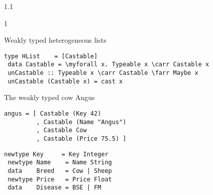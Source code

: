 \documentclass{slides}
\newenvironment{myslide}{\begin{slide}\color{Blue}\begin{boxedminipage}{1.1\hsize}\begin{boxedminipage}{1\hsize}\color{Black}
\vspace{-170\in}
}{%
\smallskip
\end{boxedminipage}
\end{boxedminipage}
\end{slide}}
\newenvironment{myslide}{\begin{slide}
}{%
\end{slide}}
\newenvironment{myslide}{\begin{slide}\color{White}\begin{boxedminipage}{1.1\hsize}\color{Black}
\vspace{-170\in}
}{%
\smallskip
\end{boxedminipage}
\end{slide}}
\newcommand{\header}[1]{{\large \color{Red} #1}}
\newcommand{\blau}[1]{{\vspace{-50\in}\normalsize \color{Blue} #1}}
\newcommand{\myforall}{\ensuremath{\forall}}
\newcommand{\farr}{\ensuremath{\to}}
\newcommand{\carr}{\ensuremath{\Rightarrow}}
\begin{document}



\begin{myslide}

\header{Weakly typed heterogeneous lists}

\bigskip

\begin{Verbatim}[fontfamily=courier,fontsize=\small,commandchars=\\\{\}]
 type HList    = [Castable]
 data Castable = \myforall x. Typeable x \carr Castable x 
 unCastable :: Typeable x \carr Castable \farr Maybe x
 unCastable (Castable x) = cast x
\end{Verbatim}

\vspace{-66\in}

\blau{The weakly typed cow Angus}

\medskip

\begin{Verbatim}[fontfamily=courier,fontsize=\small,commandchars=\\\{\}]
 angus = [ Castable (Key 42)
         , Castable (Name "Angus")
         , Castable Cow
         , Castable (Price 75.5) ] 
\end{Verbatim}

\bigskip

\begin{Verbatim}[fontfamily=courier,fontsize=\tiny,commandchars=\\\{\}]
 newtype Key     = Key Integer
 newtype Name    = Name String
 data    Breed   = Cow | Sheep
 newtype Price   = Price Float
 data    Disease = BSE | FM
\end{Verbatim}

\end{myslide}



\end{document}
